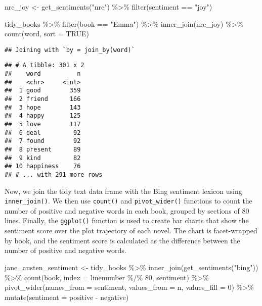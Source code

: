 \documentclass[
]{article}
\newenvironment{Shaded}{\begin{snugshade}}{\end{snugshade}}
\newcommand{\AttributeTok}[1]{\textcolor[rgb]{0.77,0.63,0.00}{#1}}
\newcommand{\ConstantTok}[1]{\textcolor[rgb]{0.00,0.00,0.00}{#1}}
\newcommand{\DecValTok}[1]{\textcolor[rgb]{0.00,0.00,0.81}{#1}}
\newcommand{\FunctionTok}[1]{\textcolor[rgb]{0.00,0.00,0.00}{#1}}
\newcommand{\NormalTok}[1]{#1}
\newcommand{\OtherTok}[1]{\textcolor[rgb]{0.56,0.35,0.01}{#1}}
\newcommand{\SpecialCharTok}[1]{\textcolor[rgb]{0.00,0.00,0.00}{#1}}
\newcommand{\StringTok}[1]{\textcolor[rgb]{0.31,0.60,0.02}{#1}}
\begin{document}
\begin{Shaded}
\begin{Highlighting}[]
\NormalTok{nrc\_joy }\OtherTok{\textless{}{-}} \FunctionTok{get\_sentiments}\NormalTok{(}\StringTok{"nrc"}\NormalTok{) }\SpecialCharTok{\%\textgreater{}\%} 
  \FunctionTok{filter}\NormalTok{(sentiment }\SpecialCharTok{==} \StringTok{"joy"}\NormalTok{)}

\NormalTok{tidy\_books }\SpecialCharTok{\%\textgreater{}\%}
  \FunctionTok{filter}\NormalTok{(book }\SpecialCharTok{==} \StringTok{"Emma"}\NormalTok{) }\SpecialCharTok{\%\textgreater{}\%}
  \FunctionTok{inner\_join}\NormalTok{(nrc\_joy) }\SpecialCharTok{\%\textgreater{}\%}
  \FunctionTok{count}\NormalTok{(word, }\AttributeTok{sort =} \ConstantTok{TRUE}\NormalTok{)}
\end{Highlighting}
\end{Shaded}

\begin{verbatim}
## Joining with `by = join_by(word)`
\end{verbatim}

\begin{verbatim}
## # A tibble: 301 x 2
##    word          n
##    <chr>     <int>
##  1 good        359
##  2 friend      166
##  3 hope        143
##  4 happy       125
##  5 love        117
##  6 deal         92
##  7 found        92
##  8 present      89
##  9 kind         82
## 10 happiness    76
## # ... with 291 more rows
\end{verbatim}

Now, we join the tidy text data frame with the Bing sentiment lexicon
using \texttt{inner\_join()}. We then use \texttt{count()} and
\texttt{pivot\_wider()} functions to count the number of positive and
negative words in each book, grouped by sections of 80 lines. Finally,
the \texttt{ggplot()} function is used to create bar charts that show
the sentiment score over the plot trajectory of each novel. The chart is
facet-wrapped by book, and the sentiment score is calculated as the
difference between the number of positive and negative words.

\begin{Shaded}
\begin{Highlighting}[]
\NormalTok{jane\_austen\_sentiment }\OtherTok{\textless{}{-}}\NormalTok{ tidy\_books }\SpecialCharTok{\%\textgreater{}\%}
  \FunctionTok{inner\_join}\NormalTok{(}\FunctionTok{get\_sentiments}\NormalTok{(}\StringTok{"bing"}\NormalTok{)) }\SpecialCharTok{\%\textgreater{}\%}
  \FunctionTok{count}\NormalTok{(book, }\AttributeTok{index =}\NormalTok{ linenumber }\SpecialCharTok{\%/\%} \DecValTok{80}\NormalTok{, sentiment) }\SpecialCharTok{\%\textgreater{}\%}
  \FunctionTok{pivot\_wider}\NormalTok{(}\AttributeTok{names\_from =}\NormalTok{ sentiment, }\AttributeTok{values\_from =}\NormalTok{ n, }\AttributeTok{values\_fill =} \DecValTok{0}\NormalTok{) }\SpecialCharTok{\%\textgreater{}\%} 
  \FunctionTok{mutate}\NormalTok{(}\AttributeTok{sentiment =}\NormalTok{ positive }\SpecialCharTok{{-}}\NormalTok{ negative)}
\end{Highlighting}
\end{Shaded}
\end{document}
